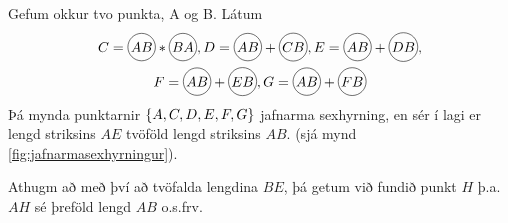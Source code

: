\begin{frame}
  \begin{hfsmid} \label{hfsmid:tvofoldunlengdar}
    Gefum okkur tvo punkta, A og B. Látum
     \begin{gather*}
       C = \hri{AB}*\hri{BA}, D = \hri{AB}+\hri{CB}, E = \hri{AB}+\hri{DB},\\
       F = \hri{AB}+\hri{EB}, G = \hri{AB}+\hri{FB}
     \end{gather*}
     Þá mynda punktarnir \(\{A,C,D,E,F,G\}\) jafnarma sexhyrning, en sér
     í lagi er lengd striksins \(AE\) tvöföld lengd striksins
     \(AB\). (sjá mynd \ref{fig:jafnarmasexhyrningur}).

     Athugm að með því að tvöfalda lengdina \(BE\),  þá getum við fundið punkt
     \(H\) þ.a. \(AH\) sé þreföld lengd \(AB\) o.s.frv.
   \end{hfsmid}
\end{frame}
